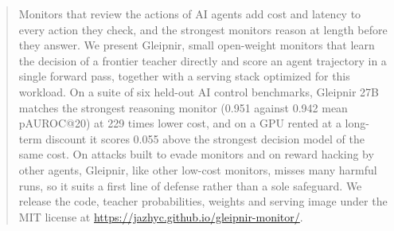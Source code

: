\begin{abstract}
Monitors that review the actions of AI agents add cost and latency to every action they check, and the strongest monitors reason at length before they answer.
We present Gleipnir, small open-weight monitors that learn the decision of a frontier teacher directly and score an agent trajectory in a single forward pass, together with a serving stack optimized for this workload.
On a suite of six held-out AI control benchmarks, Gleipnir 27B matches the strongest reasoning monitor (0.951 against 0.942 mean pAUROC@20) at 229 times lower cost, and on a GPU rented at a long-term discount it scores 0.055 above the strongest decision model of the same cost.
On attacks built to evade monitors and on reward hacking by other agents, Gleipnir, like other low-cost monitors, misses many harmful runs, so it suits a first line of defense rather than a sole safeguard.
We release the code, teacher probabilities, weights and serving image under the MIT license at \url{https://jazhyc.github.io/gleipnir-monitor/}.
\end{abstract}
